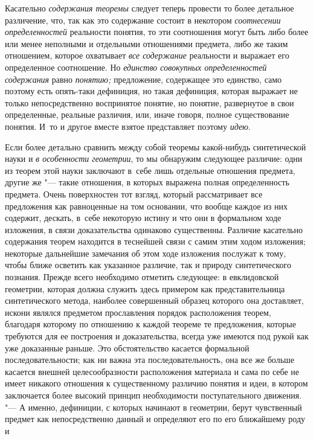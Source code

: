 Касательно {\em содержания
теоремы} следует теперь провести то более детальное
различение, что, так как это содержание состоит в некотором
{\em соотнесении определенностей}
реальности понятия, то эти соотношения могут быть либо более
или менее неполными и отдельными отношениями предмета, либо же таким
отношением, которое охватывает {\em все
содержание} реальности и выражает его определенное
соотношение. Но {\em единство совокупных
определенностей содержания} равно
{\em понятию;}
предложение, содержащее это единство, само поэтому есть
опять-таки дефиниция, но такая дефиниция, которая выражает не только
непосредственно воспринятое понятие, но понятие, развернутое в свои
определенные, реальные различия, или, иначе говоря, полное существование
понятия. И~то и другое вместе взятое представляет поэтому
{\em идею}.

Если более детально сравнить между собой теоремы какой-нибудь
синтетической науки и {\em в особенности
геометрии}, то мы обнаружим следующее различие: одни из
теорем этой науки заключают в~себе лишь отдельные отношения предмета,
другие же "--- такие отношения, в которых выражена полная
определенность предмета. Очень поверхностен тот взгляд, который
рассматривает все предложения как равноценные на том основании, что вообще
каждое из них содержит, дескать, в~себе некоторую истину и что они в
формальном ходе изложения, в связи доказательства одинаково существенны.
Различие касательно содержания теорем находится в теснейшей связи с самим
этим ходом изложения; некоторые дальнейшие замечания об этом ходе изложения
послужат к тому, чтобы ближе осветить как указанное
различие, так и природу синтетического познания. Прежде всего необходимо
отметить следующее: в евклидовской геометрии, которая должна служить здесь
примером как представительница синтетического метода, наиболее совершенный
образец которого она доставляет, искони являлся предметом прославления
порядок расположения теорем, благодаря которому по отношению к каждой
теореме те предложения, которые требуются для ее построения и
доказательства, всегда уже имеются под рукой как уже доказанные раньше. Это
обстоятельство касается формальной последовательности; как ни важна эта
последовательность, она все же больше касается внешней целесообразности
расположения материала и сама по себе не имеет никакого отношения к
существенному различию понятия и идеи, в котором заключается более высокий
принцип необходимости поступательного движения. "--- А именно,
дефиниции, с которых начинают в геометрии, берут чувственный предмет как
непосредственно данный и определяют его по его ближайшему роду и
